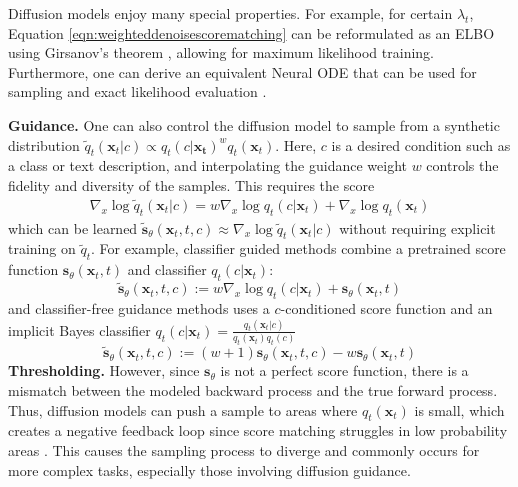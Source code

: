\documentclass{article}
\theoremstyle{plain}
\theoremstyle{definition}
\theoremstyle{remark}
\newcommand{\grad}{\nabla}
\renewcommand{\vec}{\mathbf}
\begin{document}
Diffusion models enjoy many special properties. For example, for certain $\lambda_t$, Equation \ref{eqn:weighteddenoisescorematching} can be reformulated as an ELBO using Girsanov's theorem \citep{Song2021MaximumLT,Kingma2021VariationalDM, Huang2021AVP}, allowing for maximum likelihood training. Furthermore, one can derive an equivalent Neural ODE that can be used for sampling and exact likelihood evaluation \citep{Chen2018NeuralOD}.

\textbf{Guidance.} One can also control the diffusion model to sample from a synthetic distribution $\tilde{q}_t(\vec{x}_t | c) \propto q_t(c | \vec{x_t})^w q_t(\vec{x}_t)$. Here, $c$ is a desired condition such as a class or text description, and interpolating the guidance weight $w$ controls the fidelity and diversity of the samples. This requires the score
\begin{equation}\label{eqn:bayesscore}
    \begin{gathered}
        \grad_x \log \tilde{q}_t(\vec{x}_t | c) = w\grad_x \log q_t(c | \vec{x}_t) + \grad_x \log q_t(\vec{x}_t)
    \end{gathered}
\end{equation}
which can be learned $\tilde{\vec{s}}_\theta(\vec{x}_t, t, c) \approx \grad_x \log \tilde{q}_t(\vec{x}_t | c)$ without requiring explicit training on $\tilde{q}_t$. For example, classifier guided methods \citep{Song2020ScoreBasedGM, Dhariwal2021DiffusionMB} combine a pretrained score function $\vec{s}_\theta(\vec{x}_t, t)$ and classifier $q_t(c | \vec{x}_t)$:
\begin{equation}\label{eqn:classguid}
    \tilde{\vec{s}}_\theta(\vec{x}_t, t, c) := w \grad_x \log q_t(c | \vec{x}_t) + \vec{s}_\theta(\vec{x}_t, t)
\end{equation}
and classifier-free guidance methods \citep{Ho2022ClassifierFreeDG} uses a $c$-conditioned score function and an implicit Bayes classifier $q_t(c | \vec{x}_t) = \frac{q_t(\vec{x}_t | c)}{q_t(\vec{x}_t) q_t(c)}$
\begin{equation}\label{eqn:classfreeguid}
    \tilde{\vec{s}}_\theta(\vec{x}_t, t, c) := (w + 1) \vec{s}_\theta(\vec{x}_t, t, c) - w \vec{s}_\theta(\vec{x}_t, t)
\end{equation}
\textbf{Thresholding.} However, since $\vec{s}_\theta$ is not a perfect score function, there is a mismatch between the modeled backward process and the true forward process. Thus, diffusion models can push a sample to areas where $q_t(\vec{x}_t)$ is small, which creates a negative feedback loop since score matching struggles in low probability areas \citep{Song2019GenerativeMB, Koehler2022StatisticalEO}. This causes the sampling process to diverge and commonly occurs for more complex tasks, especially those involving diffusion guidance.
\end{document}
